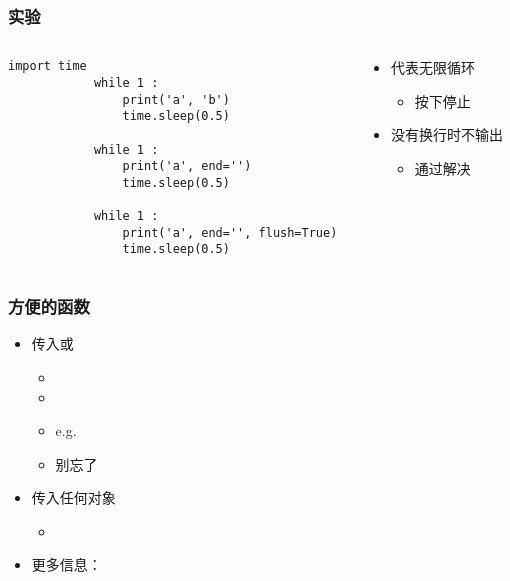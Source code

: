 \begin{frame} [fragile]
	\frametitle{实验}
	\begin{columns}[T]
		\begin{column}[T]{.5\textwidth}
			\begin{lstlisting}[style=pythonstyle, gobble=12]
			import time
			while 1 :
				print('a', 'b')
				time.sleep(0.5)

			while 1 :
				print('a', end='')
				time.sleep(0.5)

			while 1 :
				print('a', end='', flush=True)
				time.sleep(0.5)
			\end{lstlisting}
		\end{column}
		\begin{column}[T]{.5\textwidth}
			\linespread{2}
			\begin{itemize}
			\item {} 代表无限循环
				\begin{itemize}
				\item 按下停止
				\end{itemize}
			\item 没有换行时不输出
				\begin{itemize}
				\item 通过解决
				\end{itemize}
			\end{itemize}
		\end{column}
	\end{columns}
\end{frame}

\begin{frame} [fragile]
	\frametitle{方便的函数}
	\linespread{1.25}
	\begin{itemize}
	\item 传入或
		\begin{itemize}
		\item {}
		\item {}
		\item e.g. 
		\item 别忘了
		\end{itemize}
	\item 传入任何对象
		\begin{itemize}
		\item {}
		\end{itemize}
	\item 更多信息：
	\end{itemize}
\end{frame}

